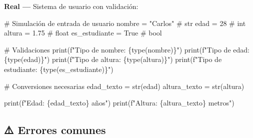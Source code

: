 \documentclass[
  doc,
  floatsintext,
  longtable,
  a4paper,
  nolmodern,
  notxfonts,
  notimes,
  12pt,
  colorlinks=true,linkcolor=blue,citecolor=blue,urlcolor=blue]{apa7}
\newenvironment{Shaded}{\begin{snugshade}}{\end{snugshade}}
\newcommand{\BuiltInTok}[1]{\textcolor[rgb]{0.00,0.23,0.31}{#1}}
\newcommand{\CommentTok}[1]{\textcolor[rgb]{0.37,0.37,0.37}{#1}}
\newcommand{\DecValTok}[1]{\textcolor[rgb]{0.68,0.00,0.00}{#1}}
\newcommand{\FloatTok}[1]{\textcolor[rgb]{0.68,0.00,0.00}{#1}}
\newcommand{\NormalTok}[1]{\textcolor[rgb]{0.00,0.23,0.31}{#1}}
\newcommand{\OperatorTok}[1]{\textcolor[rgb]{0.37,0.37,0.37}{#1}}
\newcommand{\SpecialCharTok}[1]{\textcolor[rgb]{0.37,0.37,0.37}{#1}}
\newcommand{\SpecialStringTok}[1]{\textcolor[rgb]{0.13,0.47,0.30}{#1}}
\newcommand{\StringTok}[1]{\textcolor[rgb]{0.13,0.47,0.30}{#1}}
\newcommand{\VariableTok}[1]{\textcolor[rgb]{0.07,0.07,0.07}{#1}}
\begin{document}
\textbf{Real ---} Sistema de usuario con validación:

\begin{Shaded}
\begin{Highlighting}[]
\CommentTok{\# Simulación de entrada de usuario}
\NormalTok{nombre }\OperatorTok{=} \StringTok{"Carlos"}        \CommentTok{\# str}
\NormalTok{edad }\OperatorTok{=} \DecValTok{28}               \CommentTok{\# int}
\NormalTok{altura }\OperatorTok{=} \FloatTok{1.75}           \CommentTok{\# float}
\NormalTok{es\_estudiante }\OperatorTok{=} \VariableTok{True}    \CommentTok{\# bool}

\CommentTok{\# Validaciones}
\BuiltInTok{print}\NormalTok{(}\SpecialStringTok{f"Tipo de nombre: }\SpecialCharTok{\{}\BuiltInTok{type}\NormalTok{(nombre)}\SpecialCharTok{\}}\SpecialStringTok{"}\NormalTok{)}
\BuiltInTok{print}\NormalTok{(}\SpecialStringTok{f"Tipo de edad: }\SpecialCharTok{\{}\BuiltInTok{type}\NormalTok{(edad)}\SpecialCharTok{\}}\SpecialStringTok{"}\NormalTok{)}
\BuiltInTok{print}\NormalTok{(}\SpecialStringTok{f"Tipo de altura: }\SpecialCharTok{\{}\BuiltInTok{type}\NormalTok{(altura)}\SpecialCharTok{\}}\SpecialStringTok{"}\NormalTok{)}
\BuiltInTok{print}\NormalTok{(}\SpecialStringTok{f"Tipo de estudiante: }\SpecialCharTok{\{}\BuiltInTok{type}\NormalTok{(es\_estudiante)}\SpecialCharTok{\}}\SpecialStringTok{"}\NormalTok{)}

\CommentTok{\# Conversiones necesarias}
\NormalTok{edad\_texto }\OperatorTok{=} \BuiltInTok{str}\NormalTok{(edad)}
\NormalTok{altura\_texto }\OperatorTok{=} \BuiltInTok{str}\NormalTok{(altura)}

\BuiltInTok{print}\NormalTok{(}\SpecialStringTok{f"Edad: }\SpecialCharTok{\{}\NormalTok{edad\_texto}\SpecialCharTok{\}}\SpecialStringTok{ años"}\NormalTok{)}
\BuiltInTok{print}\NormalTok{(}\SpecialStringTok{f"Altura: }\SpecialCharTok{\{}\NormalTok{altura\_texto}\SpecialCharTok{\}}\SpecialStringTok{ metros"}\NormalTok{)}
\end{Highlighting}
\end{Shaded}

\subsection{⚠️ Errores comunes}\label{errores-comunes}
\end{document}
